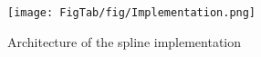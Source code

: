 \begin{figure}[t]
\centering
\texttt{[image: FigTab/fig/Implementation.png]}
\caption{Architecture of the spline implementation}
\label{fig:implementation}
\vspace{-2ex}
\end{figure}
